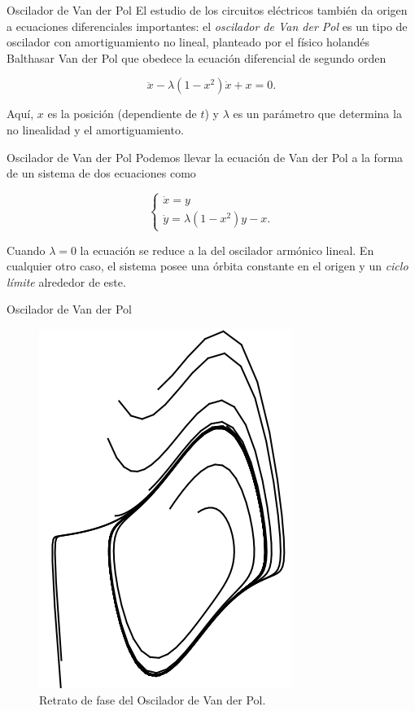 \documentclass{beamer}
\begin{document}
\begin{frame}{Oscilador de Van der Pol}
El estudio de los circuitos eléctricos también da origen a ecuaciones diferenciales importantes: el \emph{oscilador de Van der Pol} es un tipo de oscilador con amortiguamiento no lineal, planteado por el físico holandés Balthasar Van der Pol que obedece la ecuación diferencial de segundo orden

$$
	\ddot{x} - \lambda (1-x^2)\dot{x} + x = 0.
$$

Aquí, $x$ es la posición (dependiente de $t$) y $\lambda$ es un parámetro que determina la no linealidad y el amortiguamiento.
\end{frame}

\begin{frame}{Oscilador de Van der Pol}
Podemos llevar la ecuación de Van der Pol a la forma de un sistema de dos ecuaciones como

$$
\left\{	\begin{array}{l}
		\dot{x} = y \\
		\dot{y} = \lambda (1-x^2)y - x.
	\end{array}	 \right.
$$

Cuando $\lambda = 0$ la ecuación se reduce a la del oscilador armónico lineal. En cualquier otro caso, el sistema posee una órbita constante en el origen y un \emph{ciclo límite} alrededor de este.
\end{frame}

\begin{frame}{Oscilador de Van der Pol}
\begin{figure}[!ht] \centering
	\includegraphics[scale=0.35]{../figures/vanderpol.png}
	\caption{Retrato de fase del Oscilador de Van der Pol.}
\end{figure}
\end{frame}
\end{document}
